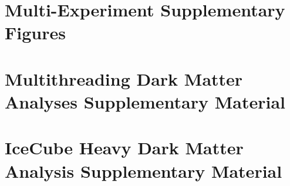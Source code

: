 \documentclass[PhD]{msu-thesis}
\begin{document}
\begin{appendices}

\chapter{Multi-Experiment Supplementary Figures}\label{apdx:gd_spatial_maps}


\chapter{Multithreading Dark Matter Analyses Supplementary Material}\label{apdx:mtd_supp_figures}


\chapter{IceCube Heavy Dark Matter Analysis Supplementary Material}\label{apdx:ic3DM_supp}



\end{appendices}

\backmatter
\SingleSpacing
\printbibliography
\end{document}

